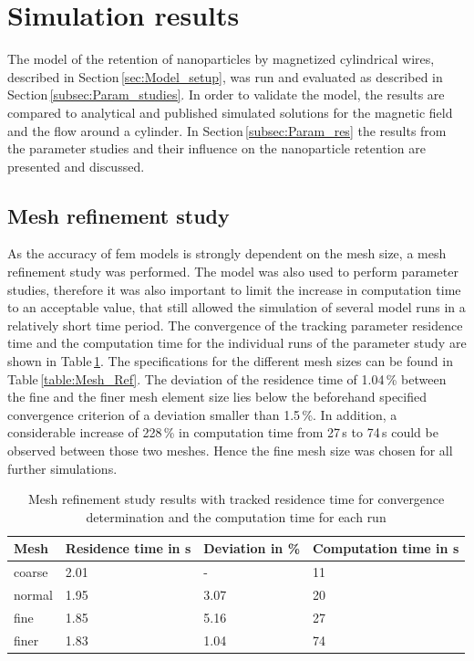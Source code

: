 \section{Simulation results}
\label{sec:sim_res}
The model of the retention of nanoparticles by magnetized cylindrical wires, described in Section\,\ref{sec:Model_setup}, was run and evaluated as described in Section\,\ref{subsec:Param_studies}. In order to validate the model, the results are compared to analytical and published simulated solutions for the magnetic field and the flow around a cylinder. In Section\,\ref{subsec:Param_res} the results from the parameter studies and their influence on the nanoparticle retention are presented and discussed.  

\subsection{Mesh refinement study}
\label{subsec:mesh_ref}
As the accuracy of \gls{fem} models is strongly dependent on the mesh size, a mesh refinement study was performed. The model was also used to perform parameter studies, therefore it was also important to limit the increase in computation time to an acceptable value, that still allowed the simulation of several model runs in a  relatively short time period. The convergence of the tracking parameter residence time and the computation time for the individual runs of the parameter study are shown in Table\,\ref{table:Mesh_Ref_res}. The specifications for the different mesh sizes can be found in Table\,\ref{table:Mesh_Ref}. The deviation of the residence time of 1.04\,\% between the fine and the finer mesh element size lies below the beforehand specified convergence criterion of a deviation smaller than 1.5\,\%. In addition, a considerable increase of 228\,\% in computation time from 27\,s to 74\,s could be observed between those two meshes. Hence the fine mesh size was chosen for all further simulations. 

\begin{table}[H]
\centering
\caption[Mesh refinement study results]{Mesh refinement study results with tracked residence time for convergence determination and the computation time for each run}
\label{table:Mesh_Ref_res}
\begin{tabularx}{\textwidth}{XXXX}
\hline
Mesh & Residence time in s & Deviation in \% & Computation time in s\\
\hline\hline
coarse &  2.01 & -  & 11\\
normal & 1.95 & 3.07 & 20\\
fine &  1.85 & 5.16 & 27 \\
finer &  1.83 & 1.04 & 74\\
\hline
\end{tabularx}
\end{table}

